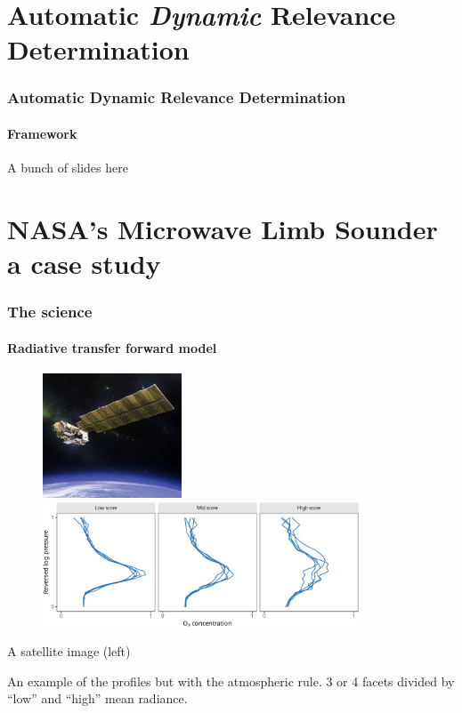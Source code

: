 \documentclass{snedecorbeamer}
\begin{document}
\section{Automatic \textit{Dynamic} Relevance Determination}

\begin{frame}
  \frametitle{Automatic Dynamic Relevance Determination}
  \framesubtitle{Framework}

  A bunch of slides here
\end{frame}

\section{NASA's Microwave Limb Sounder \\ {\small a case study}}

\begin{frame}
  \frametitle{The science}
  \framesubtitle{Radiative transfer forward model }

  \begin{figure}
    \centering
    \includegraphics[height=10em]{inc/mls_aura}
    \includegraphics[height=10em]{inc/mls_input_profiles}
  \end{figure}

  A satellite image (left)

  An example of the profiles but with the atmospheric rule. 3 or 4 facets
  divided by ``low'' and ``high'' mean radiance.
\end{frame}
\end{document}
